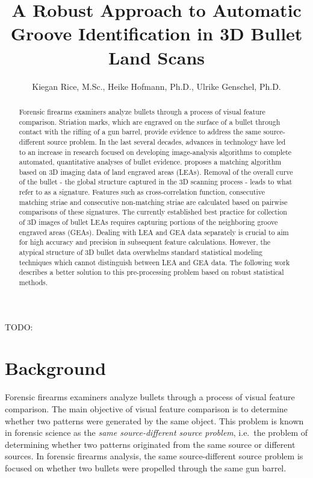 \documentclass[]{article}
\title{A Robust Approach to Automatic Groove Identification in 3D Bullet Land
Scans}
\author{Kiegan Rice, M.Sc., Heike Hofmann, Ph.D., Ulrike Genschel, Ph.D.}
\date{}
\begin{document}
\maketitle
\begin{abstract}
Forensic firearms examiners analyze bullets through a process of visual
feature comparison. Striation marks, which are engraved on the surface
of a bullet through contact with the rifling of a gun barrel, provide
evidence to address the same source-different source problem. In the
last several decades, advances in technology have led to an increase in
research focused on developing image-analysis algorithms to complete
automated, quantitative analyses of bullet evidence. \citet{Hare1}
proposes a matching algorithm based on 3D imaging data of land engraved
areas (LEAs). Removal of the overall curve of the bullet - the global
structure captured in the 3D scanning process - leads to what
\citet{Hare1} refer to as a signature. Features such as
cross-correlation function, consecutive matching striae and consecutive
non-matching striae are calculated based on pairwise comparisons of
these signatures. The currently established best practice for collection
of 3D images of bullet LEAs requires capturing portions of the
neighboring groove engraved areas (GEAs). Dealing with LEA and GEA data
separately is crucial to aim for high accuracy and precision in
subsequent feature calculations. However, the atypical structure of 3D
bullet data overwhelms standard statistical modeling techniques which
cannot distinguish between LEA and GEA data. The following work
describes a better solution to this pre-processing problem based on
robust statistical methods.
\end{abstract}

TODO:

\section{Background}

Forensic firearms examiners analyze bullets through a process of visual
feature comparison. The main objective of visual feature comparison is
to determine whether two patterns were generated by the same object.
This problem is known in forensic science as the \emph{same
source-different source problem}, i.e.~the problem of determining
whether two patterns originated from the same source or different
sources. In forensic firearms analysis, the same source-different source
problem is focused on whether two bullets were propelled through the
same gun barrel.
\end{document}
